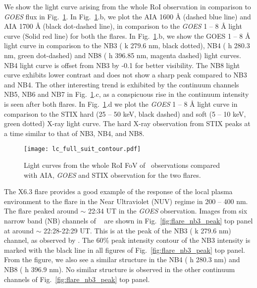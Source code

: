 We show the light curve arising from the whole RoI observation in comparison to {\it GOES} flux in Fig.~\ref{fig:flare_full}. In Fig.~\ref{fig:flare_full}.b, we plot the AIA 1600 {\AA} (dashed blue line) and AIA 1700 {\AA} (black dot-dashed line), in comparison to the {\it GOES} 1 {--} 8 {\AA} light curve (Solid red line) for both the flares. In Fig.~\ref{fig:flare_full}.b, we show the GOES 1 {--} 8 {\AA} light curve in comparison to the NB3 ( k 279.6 nm, black dotted), NB4 ( h 280.3 nm, green dot-dashed) and NB8 ( h 396.85 nm, magenta dashed) light curves. NB4 light curve is offset from NB3 by -0.1 for better visibility. The NB8 light curve exhibits lower contrast and does not show a sharp peak compared to NB3 and NB4. The other interesting trend is exhibited by the continuum channels NB5, NB6 and NB7 in Fig.~\ref{fig:flare_full}.c, as a conspicuous rise in the continuum intensity is seen after both flares. In Fig.~\ref{fig:flare_full}.d we plot the {\it GOES} 1 {--} 8 {\AA} light curve in comparison to the STIX hard (25 {--} 50 keV, black dashed) and soft (5 {--} 10 keV, green dotted) X-ray light curve. The hard X-ray observation from STIX peaks at a time similar to that of NB3, NB4, and NB8.

\begin{figure}[ht!]
    \centering
    \texttt{[image: lc\_full\_suit\_contour.pdf]}
    \caption{Light curves from the whole RoI FoV of \suit~observations compared with AIA, {\it GOES} and STIX observation for the two flares.}
    \label{fig:flare_full}
\end{figure}

The X6.3 flare provides a good example of the response of the local plasma environment to the flare in the Near Ultraviolet (NUV) regime in 200 {--} 400 nm. The flare peaked around $\sim$ 22:34 UT in the {\it GOES} observation. Images from six narrow band (NB) channels of \suit~ are shown in Fig.~\ref{fig:flare_nb3_peak} top panel at around $\sim$ 22:28-22:29 UT. This is at the peak of the NB3 ( k 279.6 nm) channel, as observed by \suit. The 60\% peak intensity contour of the NB3 intensity is marked with the black line in all figures of Fig.~\ref{fig:flare_nb3_peak} top panel. From the figure, we also see a similar structure in the NB4 ( h 280.3 nm) and NB8 ( h 396.9 nm). No similar structure is observed in the other continuum channels of Fig.~\ref{fig:flare_nb3_peak} top panel.


